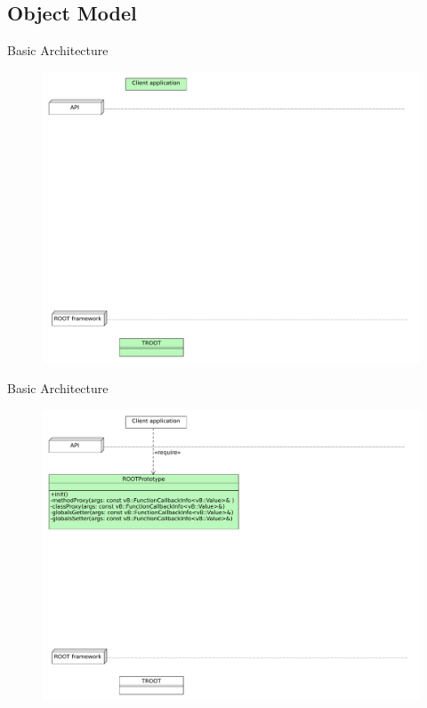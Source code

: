 \subsection{Object Model}

\begin{frame}{Basic Architecture}
  \begin{figure}[htb]
    \centering
      \includegraphics[width=\textwidth, height=.85\textheight, keepaspectratio]{./resources/architecture/architecture_h0.pdf}
  \end{figure}
\end{frame}

\begin{frame}{Basic Architecture}
  \begin{figure}[htb]
    \centering
      \includegraphics[width=\textwidth, height=.85\textheight, keepaspectratio]{./resources/architecture/architecture_h1.pdf}
  \end{figure}
\end{frame}

